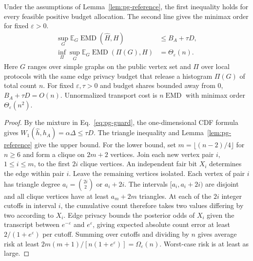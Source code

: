 \begin{theorem}\label{thm:pg-risk}
Under the assumptions of Lemma~\ref{lem:pg-reference}, the first inequality holds for every feasible positive budget allocation. The second line gives the minimax order for fixed $\varepsilon>0$.
\begin{equation}
\begin{aligned}
 \sup_G\mathbb E_G\operatorname{EMD}(\widehat H,H)
     &\leq B_A+\tau D,\\
 \inf_\Pi\sup_G\mathbb E_G\operatorname{EMD}(\Pi(G),H)
     &=\Theta_{\varepsilon}(n).
\end{aligned}
\label{eq:pg-minimax}
\end{equation}
Here $G$ ranges over simple graphs on the public vertex set and $\Pi$ over local protocols with the same edge privacy budget that release a histogram $\Pi(G)$ of total count $n$.
For fixed $\varepsilon,\tau>0$ and budget shares bounded away from 0, $B_A+\tau D=O(n)$. Unnormalized transport cost is $n\operatorname{EMD}$ with minimax order $\Theta_\varepsilon(n^2)$.
\end{theorem}
\begin{proof}
By the mixture in Eq.~\eqref{eq:pg-guard}, the one-dimensional CDF formula gives $W_1(\widehat h,h_A)=\alpha\Delta\leq\tau D$. The triangle inequality and Lemma~\ref{lem:pg-reference} give the upper bound. For the lower bound, set $m=\lfloor(n-2)/4\rfloor$ for $n\geq6$ and form a clique on $2m+2$ vertices. Join each new vertex pair $i$, $1\leq i\leq m$, to the first $2i$ clique vertices. An independent fair bit $X_i$ determines the edge within pair $i$. Leave the remaining vertices isolated.
Each vertex of pair $i$ has triangle degree $a_i=\binom{2i}{2}$ or $a_i+2i$. The intervals $[a_i,a_i+2i)$ are disjoint and all clique vertices have at least $a_m+2m$ triangles.
At each of the $2i$ integer cutoffs in interval $i$, the cumulative count therefore takes two values differing by two according to $X_i$.
Edge privacy bounds the posterior odds of $X_i$ given the transcript between $e^{-\varepsilon}$ and $e^\varepsilon$, giving expected absolute count error at least $2/(1+e^\varepsilon)$ per cutoff.
Summing over cutoffs and dividing by $n$ gives average risk at least $2m(m+1)/[n(1+e^\varepsilon)]=\Omega_\varepsilon(n)$. Worst-case risk is at least as large.
\end{proof}

